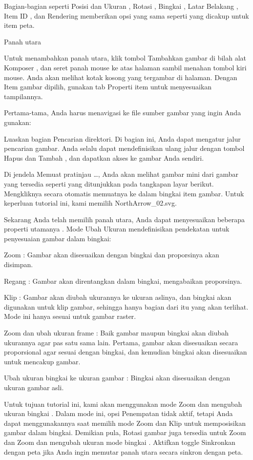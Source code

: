 \documentclass[]{book}
\begin{document}
Bagian-bagian seperti Posisi dan Ukuran , Rotasi , Bingkai , Latar Belakang , Item ID , dan Rendering memberikan opsi yang sama seperti yang dicakup untuk item peta.

Panah utara

Untuk menambahkan panah utara, klik tombol Tambahkan gambar di bilah alat Komposer , dan seret panah mouse ke atas halaman sambil menahan tombol kiri mouse. Anda akan melihat kotak kosong yang tergambar di halaman. Dengan Item gambar dipilih, gunakan tab Properti item untuk menyesuaikan tampilannya.

Pertama-tama, Anda harus menavigasi ke file sumber gambar yang ingin Anda gunakan:

Luaskan bagian Pencarian direktori. Di bagian ini, Anda dapat mengatur jalur pencarian gambar. Anda selalu dapat mendefinisikan ulang jalur dengan tombol Hapus dan Tambah , dan dapatkan akses ke gambar Anda sendiri.

Di jendela Memuat pratinjau \ldots{}, Anda akan melihat gambar mini dari gambar yang tersedia seperti yang ditunjukkan pada tangkapan layar berikut. Mengkliknya secara otomatis memuatnya ke dalam bingkai item gambar. Untuk keperluan tutorial ini, kami memilih NorthArrow\_02.svg.

Sekarang Anda telah memilih panah utara, Anda dapat menyesuaikan beberapa properti utamanya . Mode Ubah Ukuran mendefinisikan pendekatan untuk penyesuaian gambar dalam bingkai:

Zoom : Gambar akan disesuaikan dengan bingkai dan proporsinya akan disimpan.

Regang : Gambar akan direntangkan dalam bingkai, mengabaikan proporsinya.

Klip : Gambar akan diubah ukurannya ke ukuran aslinya, dan bingkai akan digunakan untuk klip gambar, sehingga hanya bagian dari itu yang akan terlihat. Mode ini hanya sesuai untuk gambar raster.

Zoom dan ubah ukuran frame : Baik gambar maupun bingkai akan diubah ukurannya agar pas satu sama lain. Pertama, gambar akan disesuaikan secara proporsional agar sesuai dengan bingkai, dan kemudian bingkai akan disesuaikan untuk mencakup gambar.

Ubah ukuran bingkai ke ukuran gambar : Bingkai akan disesuaikan dengan ukuran gambar asli.

Untuk tujuan tutorial ini, kami akan menggunakan mode Zoom dan mengubah ukuran bingkai . Dalam mode ini, opsi Penempatan tidak aktif, tetapi Anda dapat menggunakannya saat memilih mode Zoom dan Klip untuk memposisikan gambar dalam bingkai. Demikian pula, Rotasi gambar juga tersedia untuk Zoom dan Zoom dan mengubah ukuran mode bingkai . Aktifkan toggle Sinkronkan dengan peta jika Anda ingin memutar panah utara secara sinkron dengan peta.
\end{document}
